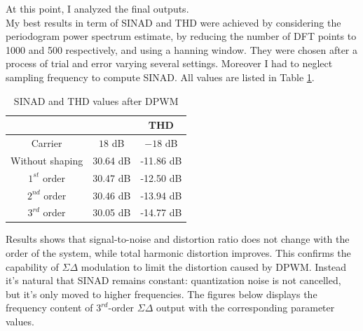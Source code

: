 \documentclass[11pt,a4paper]{article}
\begin{document}
At this point, I analyzed the final outputs.
\\
My best results in term of SINAD and THD were achieved by considering the periodogram power spectrum estimate, by reducing the number of DFT points to 1000 and 500 respectively, and using a hanning window. They were chosen after a process of trial and error varying several settings. Moreover I had to neglect sampling frequency to compute SINAD. All values are listed in Table \ref{t2}.
\begin{table}[H]
	\centering
	\begin{tabular}{c|c|c} 
		\centering{$\Sigma\Delta$ DPWM} & \centering{SINAD} & THD \\
		\hline
		Carrier& $18$ dB & $-18$ dB  \\
		Without shaping& 30.64 dB & -11.86 dB  \\
		$1^{st}$ order & 30.47 dB & -12.50 dB \\
		$2^{nd}$ order & 30.46 dB & -13.94 dB \\ 
		$3^{rd}$ order & 30.05 dB & -14.77 dB \\ 
	\end{tabular}
\caption{SINAD and THD values after DPWM}
\label{t2}
\end{table}
Results shows that signal-to-noise and distortion ratio does not change with the order of the system, while total harmonic distortion improves. This confirms the capability of $\Sigma\Delta$ modulation to limit the distortion caused by DPWM. Instead it's natural that SINAD remains constant: quantization noise is not cancelled, but it's only moved to higher frequencies. The figures below displays the frequency content of  $3^{rd}$-order $\Sigma\Delta$ output with the corresponding parameter values.
\end{document}
